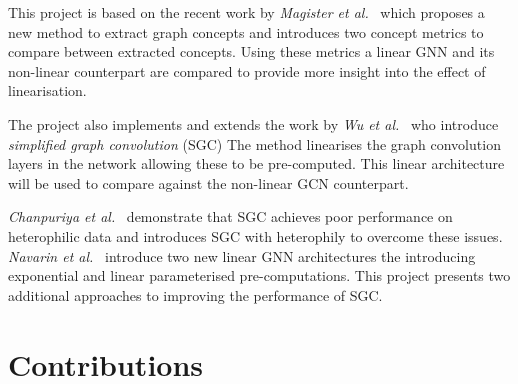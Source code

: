





This project is based on the recent work by \textit{Magister et al.}~\cite{magister2021gcexplainer} which proposes a new method to extract graph concepts and introduces two concept metrics to compare between extracted concepts.
Using these metrics a linear GNN and its non-linear counterpart are compared to provide more insight into the effect of linearisation.




The project also implements and extends the work by \textit{Wu et al.}~\cite{wu2019simplifying} who introduce \emph{simplified graph convolution} (SGC)
The method linearises the graph convolution layers in the network allowing these to be pre-computed.
This linear architecture will be used to compare against the non-linear GCN counterpart.




\textit{Chanpuriya et al.}~\cite{chanpuriya2022simplified} demonstrate that SGC achieves poor performance on heterophilic data and introduces SGC with heterophily to overcome these issues.
\textit{Navarin et al.}~\cite{navarin2020linear} introduce two new linear GNN architectures the introducing exponential and linear parameterised pre-computations.
This project presents two additional approaches to improving the performance of SGC.


\section{Contributions}

